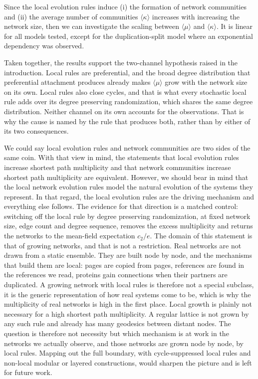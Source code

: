 \documentclass[reprint,aps,pre,amsmath,amssymb,superscriptaddress,showpacs]{revtex4-1}
\begin{document}
Since the local evolution rules induce (i) the formation of network communities and (ii) the average number of communities $\langle\kappa\rangle$ increases with increasing the network size, then we can investigate the scaling between $\langle\mu\rangle$ and $\langle\kappa\rangle$. It is linear for all models tested, except for the duplication-split model where an exponential dependency was observed.

Taken together, the results support the two-channel hypothesis raised in the introduction. Local rules are preferential, and the broad degree distribution that preferential attachment produces already makes $\langle\mu\rangle$ grow with the network size on its own. Local rules also close cycles, and that is what every stochastic local rule adds over its degree preserving randomization, which shares the same degree distribution. Neither channel on its own accounts for the observations. That is why the cause is named by the rule that produces both, rather than by either of its two consequences.

We could say local evolution rules and network communities are two sides of the same coin. With that view in mind, the statements that local evolution rules increase shortest path multiplicity and that network communities increase shortest path multiplicity  are equivalent. However, we should bear in mind that the local network evolution rules model the natural evolution of the systems they represent. In that regard, the local evolution rules are the driving mechanism and everything else follows. The evidence for that direction is a matched control: switching off the local rule by degree preserving randomization, at fixed network size, edge count and degree sequence, removes the excess multiplicity and returns the networks to the mean-field expectation $c_2/e$. The domain of this statement is that of growing networks, and that is not a restriction. Real networks are not drawn from a static ensemble. They are built node by node, and the mechanisms that build them are local: pages are copied from pages, references are found in the references we read, proteins gain connections when their partners are duplicated. A growing network with local rules is therefore not a special subclass, it is the generic representation of how real systems come to be, which is why the multiplicity of real networks is high in the first place. Local growth is plainly not necessary for a high shortest path multiplicity. A regular lattice is not grown by any such rule and already has many geodesics between distant nodes. The question is therefore not necessity but which mechanism is at work in the networks we actually observe, and those networks are grown node by node, by local rules. Mapping out the full boundary, with cycle-suppressed local rules and non-local modular or layered constructions, would sharpen the picture and is left for future work.
\end{document}
